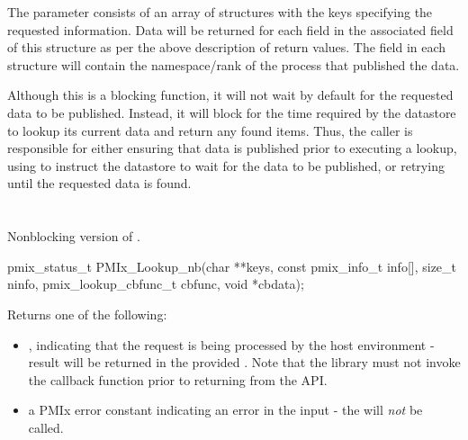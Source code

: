 The  parameter consists of an array of  structures with the keys specifying the requested information.
Data will be returned for each  field in the associated  field of this structure as per the above description of return values. The  field in each  structure will contain the namespace/rank of the process that published the data.

\adviceuserstart
Although this is a blocking function, it will not wait by default for the requested data to be published.
Instead, it will block for the time required by the datastore to lookup its current data and return any found items.
Thus, the caller is responsible for either ensuring that data is published prior to executing a lookup, using  to instruct the datastore to wait for the data to be published, or retrying until the requested data is found.
\adviceuserend


\section{}

\summary

Nonblocking version of .

\format

\cspecificstart
\begin{codepar}
pmix_status_t
PMIx_Lookup_nb(char **keys,
               const pmix_info_t info[], size_t ninfo,
               pmix_lookup_cbfunc_t cbfunc, void *cbdata);
\end{codepar}
\cspecificend

\begin{arglist}
\end{arglist}

Returns one of the following:

\begin{itemize}
    \item {}, indicating that the request is being processed by the host environment - result will be returned in the provided . Note that the library must not invoke the callback function prior to returning from the \ac{API}.
    \item a PMIx error constant indicating an error in the input - the  will \textit{not} be called.
\end{itemize}

